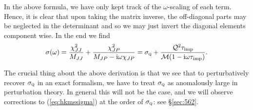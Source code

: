 \documentclass[10pt, oneside]{book}
\begin{document}
\begin{doublespace}
\begin{equation}
\end{equation}
In the above formula, we have only kept track of the $\omega$-scaling of each term.  Hence, it is clear that upon taking the matrix inverse, the off-diagonal parts may be neglected in the determinant and so we may just invert the diagonal elements component wise.  In the end we find \begin{equation}
\sigma(\omega) = \frac{\chi_{JJ}^2}{M_{JJ}} + \frac{\chi_{JP}^2}{M_{JP}-\mathrm{i}\omega \chi_{JP}}= \sigma_{\textsc{q}} + \frac{\mathcal{Q}^2\tau_{\mathrm{imp}}}{\mathcal{M}(1-\mathrm{i}\omega\tau_{\mathrm{imp}})}.
\end{equation}


The crucial thing about the above derivation is that we see that to perturbatively recover $\sigma_{\textsc{q}}$ in an exact formalism, we have to treat $\sigma_{\textsc{q}}$ as anomalously large in perturbation theory.  In general this will not be the case, and we will observe corrections to (\ref{eq:hkmssigma}) at the order of $\sigma_{\textsc{q}}$: see \S \ref{sec:562}.


\end{doublespace}
\end{document}
